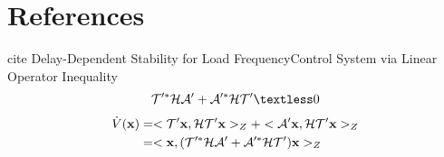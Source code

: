 \documentclass[twocolumn]{autart}    %
\begin{document}
\section{References}
cite Delay-Dependent Stability for Load FrequencyControl System via Linear Operator Inequality 
\begin{equation}
    \begin{aligned}
        \setlength{\arraycolsep}{0.9pt}
        \mathcal{T}'^{*}\mathcal{H}\mathcal{A}'+\mathcal{A}'^{*}\mathcal{H}\mathcal{T}' \textless 0
    \end{aligned}
\end{equation}
\begin{equation}
    \begin{aligned}
        \setlength{\arraycolsep}{0.9pt}
        \dot{V}(\bold{x}) &= <\mathcal{T}'\bold{x},\mathcal{H}\mathcal{T}'\bold{x}>_{Z} + <\mathcal{A}'\bold{x},\mathcal{H}\mathcal{T}'\bold{x}>_{Z} \\ &=<\bold{x},(\mathcal{T}'^{*}\mathcal{H}\mathcal{A}'+\mathcal{A}'^{*}\mathcal{H}\mathcal{T}')\bold{x}>_{Z}  
    \end{aligned}
\end{equation}
\end{document}
